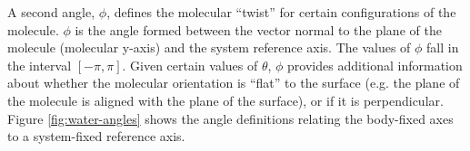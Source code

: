 	A second angle, $\phi$, defines the molecular ``twist'' for certain configurations of the molecule. $\phi$ is the angle formed between the vector normal to the plane of the molecule (molecular y-axis) and the system reference axis. The values of $\phi$ fall in the interval $[-\pi,\pi]$. Given certain values of $\theta$, $\phi$ provides additional information about whether the molecular orientation is ``flat'' to the surface (e.g. the plane of the molecule is aligned with the plane of the surface), or if it is perpendicular. %
	Figure \ref{fig:water-angles} shows the angle definitions relating the body-fixed axes to a system-fixed reference axis. 



